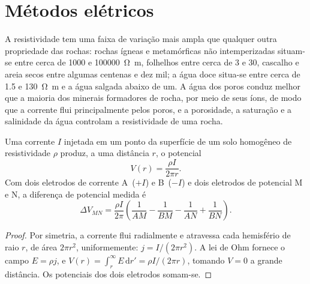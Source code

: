 \section{Métodos elétricos}\label{sec:b3:field-lab-methods-3:electrical}

A resistividade tem uma faixa de variação mais ampla que qualquer outra propriedade das rochas:
rochas ígneas e metamórficas não intemperizadas situam-se entre cerca de
\num{1000} e \qty{100000}{\ohm\metre}, folhelhos entre cerca de
\num{3} e \num{30}, cascalho e areia secos entre algumas centenas e dez
mil; a água doce situa-se entre cerca de \num{1.5} e
\qty{130}{\ohm\metre} e a água salgada abaixo de um. A água dos poros conduz
melhor que a maioria dos minerais formadores de rocha, por meio de seus íons, de modo que a corrente
flui principalmente pelos poros, e a porosidade, a saturação e
a salinidade da água controlam a resistividade de uma rocha.

\begin{theorem}\label{thm:b3:field-lab-methods-3:point-source}
Uma corrente $I$ injetada em um ponto da superfície de um solo homogêneo de
resistividade $\rho$ produz, a uma distância $r$, o potencial
\[
V(r) = \frac{\rho I}{2\pi r} .
\]
Com dois eletrodos de corrente A~($+I$) e B~($-I$) e dois eletrodos de potencial
M e N, a diferença de potencial medida é
\[
\Delta V_{MN} = \frac{\rho I}{2\pi}\left(\frac{1}{AM} - \frac{1}{BM}
               - \frac{1}{AN} + \frac{1}{BN}\right) .
\]
\end{theorem}

\begin{proof}
Por simetria, a corrente flui radialmente e atravessa cada hemisfério de
raio $r$, de área $2\pi r^2$, uniformemente: $j = I/(2\pi r^2)$. A lei de Ohm
fornece o campo $E = \rho j$, e $V(r) = \int_r^\infty E\,\mathrm{d}r'
= \rho I/(2\pi r)$, tomando $V = 0$ a grande distância. Os potenciais dos dois
eletrodos somam-se.
\end{proof}

